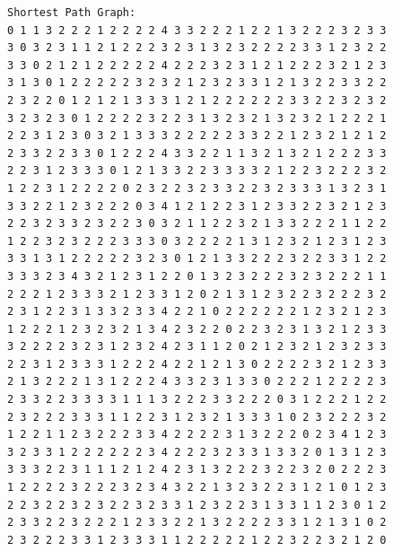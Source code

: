 \documentclass[11pt]{article}
\begin{document}
\begin{lstlisting}
Shortest Path Graph:
0 1 1 3 2 2 2 1 2 2 2 2 4 3 3 2 2 2 1 2 2 1 3 2 2 2 3 2 3 3
3 0 3 2 3 1 1 2 1 2 2 2 3 2 3 1 3 2 3 2 2 2 2 3 3 1 2 3 2 2
3 3 0 2 1 2 1 2 2 2 2 2 4 2 2 2 3 2 3 1 2 1 2 2 2 3 2 1 2 3
3 1 3 0 1 2 2 2 2 2 3 2 3 2 1 2 3 2 3 3 1 2 1 3 2 2 3 3 2 2
2 3 2 2 0 1 2 1 2 1 3 3 3 1 2 1 2 2 2 2 2 2 3 3 2 2 3 2 3 2
3 2 3 2 3 0 1 2 2 2 2 3 2 2 3 1 3 2 3 2 1 3 2 3 2 1 2 2 2 1
2 2 3 1 2 3 0 3 2 1 3 3 3 2 2 2 2 2 3 3 2 2 1 2 3 2 1 2 1 2
2 3 3 2 2 3 3 0 1 2 2 2 4 3 3 2 2 1 1 3 2 1 3 2 1 2 2 2 3 3
2 2 3 1 2 3 3 3 0 1 2 1 3 3 2 2 3 3 3 3 2 1 2 2 3 2 2 2 3 2
1 2 2 3 1 2 2 2 2 0 2 3 2 2 3 2 3 3 2 2 3 2 3 3 3 1 3 2 3 1
3 3 2 2 1 2 3 2 2 2 0 3 4 1 2 1 2 2 3 1 2 3 3 2 2 3 2 1 2 3
2 2 3 2 3 3 2 3 2 2 3 0 3 2 1 1 2 2 3 2 1 3 3 2 2 2 1 1 2 2
1 2 2 3 2 3 2 2 2 3 3 3 0 3 2 2 2 2 1 3 1 2 3 2 1 2 3 1 2 3
3 3 1 3 1 2 2 2 2 2 3 2 3 0 1 2 1 3 3 2 2 2 3 2 2 3 3 1 2 2
3 3 3 2 3 4 3 2 1 2 3 1 2 2 0 1 3 2 3 2 2 2 3 2 3 2 2 2 1 1
2 2 2 1 2 3 3 3 2 1 2 3 3 1 2 0 2 1 3 1 2 3 2 2 3 2 2 2 3 2
2 3 1 2 2 3 1 3 3 2 3 3 4 2 2 1 0 2 2 2 2 2 2 1 2 3 2 1 2 3
1 2 2 2 1 2 3 2 3 2 1 3 4 2 3 2 2 0 2 2 3 2 3 1 3 2 1 2 3 3
3 2 2 2 2 3 2 3 1 2 3 2 4 2 3 1 1 2 0 2 1 2 3 2 1 2 3 2 3 3
2 2 3 1 2 3 3 3 1 2 2 2 4 2 2 1 2 1 3 0 2 2 2 2 3 2 1 2 3 3
2 1 3 2 2 2 1 3 1 2 2 2 4 3 3 2 3 1 3 3 0 2 2 2 1 2 2 2 2 3
2 3 3 2 2 3 3 3 3 1 1 1 3 2 2 2 3 3 2 2 2 0 3 1 2 2 2 1 2 2
2 3 2 2 2 3 3 3 1 1 2 2 3 1 2 3 2 1 3 3 3 1 0 2 3 2 2 2 3 2
1 2 2 1 1 2 3 2 2 2 3 3 4 2 2 2 2 3 1 3 2 2 2 0 2 3 4 1 2 3
3 2 3 3 1 2 2 2 2 2 2 3 4 2 2 2 3 2 3 3 1 3 3 2 0 1 3 1 2 3
3 3 3 2 2 3 1 1 1 2 1 2 4 2 3 1 3 2 2 2 3 2 2 3 2 0 2 2 2 3
1 2 2 2 2 3 2 2 2 3 2 3 4 3 2 2 1 3 2 3 2 2 3 1 2 1 0 1 2 3
2 2 3 2 2 3 2 3 2 2 3 2 3 3 1 2 3 2 2 3 1 3 3 1 1 2 3 0 1 2
2 3 3 2 2 3 2 2 2 1 2 3 3 2 2 1 3 2 2 2 2 3 3 1 2 1 3 1 0 2
2 3 2 2 2 3 3 1 2 3 3 3 1 1 2 2 2 2 2 1 2 2 3 2 2 3 2 1 2 0


\end{lstlisting}
\end{document}

